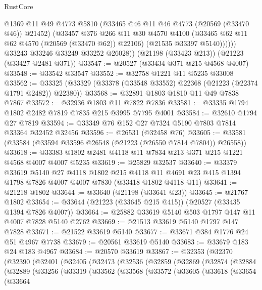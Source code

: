\begin{lexlean}{RustCore}
\begin{coremodule}
                @1369
                @11
                @49
                @4773
                @5810
                (@33465 @46 @11 @46 @4773 (@20569 (@33470 @46)) @21452)
                (@33457
                  @376
                  @266
                  @11
                  @30
                  @4570
                  @4100
                  (@33465 @62 @11 @62 @4570 (@20569 (@33470 @62)) @22106)
                  (@21535 @33397 @5140))))))
        @33243
        @33246
        @33249
        @33252
        @26028))
    (@21198 (@33423 @213))
    (@21223 (@33427 @2481 @371))
@33547 := @20527 (@33434 @371 @215 @4568 @4007)
@33548 := @33542 @33547
@33552 := @32758 @1221 @11 @5235 @33008
@33562 := @33325 (@33329 (@33378 (@33548 @33552) @22368 (@21223 (@22374 @1791 @2482)) @22380))
@33568 := @32891 @1803 @1810 @11 @49 @7838 @7867
@33572 := @32936 @1803 @11 @7822 @7836
@33581 := @33335 @1794 @1802 @2482 @7819 @7835 @215 @3995 @7795 @4001
@33584 := @32610 @1794 @27 @7819
@33594 := @33349 @76 @152 @27 @7324 @5190 @7803 @7814 @33364 @32452 @32456
@33596 := @26531 (@32458 @76)
@33605 := @33581 (@33584 (@33594 @33596 @26548 (@21223 (@26550 @7814 @7804)) @26558))
@33618 := @33383 @1802 @2481 @4118 @11 @7834 @213 @371 @215 @1221 @4568 @4007 @4007 @5235
@33619 := @25829 @32537
@33640 := @33379
    @33619
    @5140
    @27
    @4118
    @1802
    @215
    @4118
    @11
    @4691
    @23
    @415
    @1394
    @1798
    @7826
    @4007
    @4007
    @7830
    (@33418 @1802 @4118 @11)
@33641 := @21218 @1802
@33644 := @33640 (@21198 (@33641 @23))
@33645 := @21767 @1802
@33654 := @33644 (@21223 (@33645 @215 @415)) (@20527 (@33435 @1394 @7826 @4007))
@33664 := @25882 @33619 @5140 @503 @1797 @147 @11 @4007 @7828 @5140 @2762
@33669 := @21513 @33619 @5140 @1797 @147 @7828
@33671 := @21522 @33619 @5140
@33677 := @33671 @384 @1776 @24 @51 @4967 @7738
@33679 := @20561 @33619 @5140
@33683 := @33679 @183 @24 @183 @4967
@33684 := @20570 @33619
@33867 := @32353
    (@32370
      (@32390
        (@32401
          (@32405
            (@32473
              (@32536
                (@32859
                  (@32869
                    (@32874
                      (@32884
                        (@32889
                          (@33256
                            (@33319
                              (@33562
                                (@33568
                                  (@33572
                                    (@33605
                                      (@33618
                                        (@33654
                                          (@33664

\end{coremodule}
\end{lexlean}
